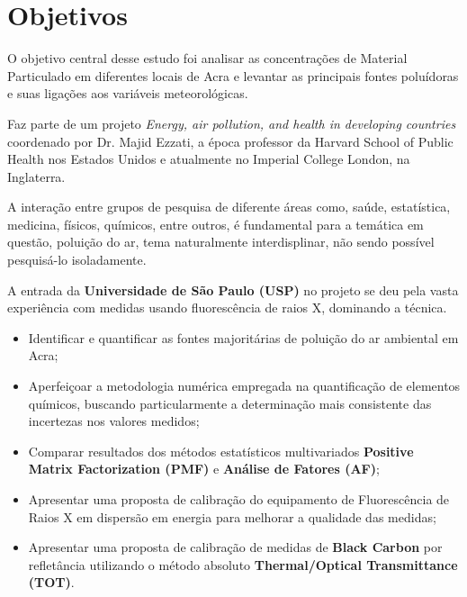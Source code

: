 \section{Objetivos}

O objetivo central desse estudo foi analisar as concentrações de Material 
Particulado em diferentes locais de Acra e levantar as principais fontes 
poluídoras e suas ligações aos variáveis meteorológicas. 

Faz parte de um projeto \textit{Energy, air pollution, and health 
in developing countries} coordenado por Dr. Majid Ezzati, 
a época professor da Harvard School of Public Health nos 
Estados Unidos e atualmente no Imperial College London, 
na Inglaterra.  

A interação entre grupos de pesquisa de diferente áreas como, saúde, 
estatística, medicina, físicos, químicos, entre outros, é fundamental
para a temática em questão, poluição do ar, tema naturalmente  
interdisplinar, não sendo possível pesquisá-lo isoladamente. 

A entrada da \textbf{Universidade de São Paulo (USP)} no projeto se deu pela
vasta experiência com medidas usando fluorescência de raios X, dominando a técnica.

\begin{itemize}
  \item Identificar e quantificar as fontes majoritárias de poluição do ar ambiental em Acra;
  \item Aperfeiçoar a metodologia numérica empregada na quantificação de elementos químicos, 
        buscando particularmente a determinação mais consistente das incertezas nos valores medidos;
  \item Comparar resultados dos métodos estatísticos multivariados
        \textbf{Positive Matrix Factorization (PMF)} e \textbf{Análise de Fatores (AF)};
  \item Apresentar uma proposta de calibração do equipamento de Fluorescência de Raios X
        em dispersão em energia para melhorar a qualidade das medidas;
  \item Apresentar uma proposta de calibração de medidas de \textbf{Black Carbon} por refletância
        utilizando o método absoluto \textbf{Thermal/Optical Transmittance (TOT)}.
\end{itemize}




